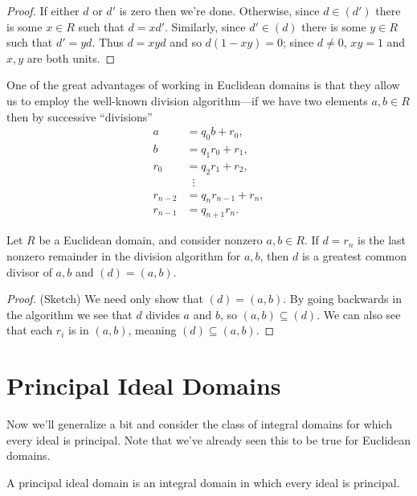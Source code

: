 \documentclass[../m171main.tex]{subfiles}
\begin{document}
\begin{proof}
    If either $d$ or $d'$ is zero then we're done.
    Otherwise, since $d \in (d')$ there is some $x \in R$ such that $d = xd'$.
    Similarly, since $d' \in (d)$ there is some $y \in R$ such that $d' = yd$.
    Thus $d = xyd$ and so $d(1 - xy) = 0$; since $d \neq 0$, $xy = 1$ and $x,y$ are both units.
\end{proof}

One of the great advantages of working in Euclidean domains is that they allow us to employ the well-known division algorithm---if we have two elements $a,b \in R$ then by successive ``divisions''
\begin{align*}
    a &= q_0b + r_0, \\
    b &= q_1 r_0 + r_1, \\
    r_0 &= q_2 r_1 + r_2, \\
    &\;\;\vdots \\
    r_{n-2} &= q_n r_{n-1} + r_n, \\
    r_{n-1} &= q_{n+1} r_n.
\end{align*}

\begin{theorem}[]
    Let $R$ be a Euclidean domain, and consider nonzero $a,b \in R$.
    If $d = r_n$ is the last nonzero remainder in the division algorithm for $a,b$, then $d$ is a greatest common divisor of $a,b$ and $(d) = (a,b)$.
\end{theorem}

\begin{proof}
    (Sketch) We need only show that $(d) = (a,b)$.
    By going backwards in the algorithm we see that $d$ divides $a$ and $b$, so $(a,b) \subseteq (d)$.
    We can also see that each $r_i$ is in $(a,b)$, meaning $(d) \subseteq (a,b)$.
\end{proof}


\section{Principal Ideal Domains}
Now we'll generalize a bit and consider the class of integral domains for which every ideal is principal.
Note that we've already seen this to be true for Euclidean domains.

\begin{definition}
    A principal ideal domain is an integral domain in which every ideal is principal.
\end{definition}
\end{document}
